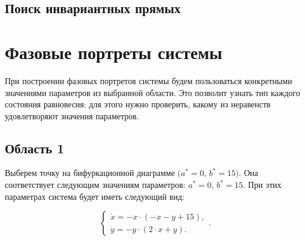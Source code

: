 \subsection{Поиск инвариантных прямых}
\newpage

\section{Фазовые портреты системы}
При построении фазовых портретов системы будем пользоваться конкретными значениями параметров из выбранной области. Это позволит узнать тип каждого состояния равновесия: для этого нужно проверить, какому из неравенств удовлетворяют значения параметров.

\subsection{Область 1}
Выберем точку на бифуркационной диаграмме $(a^\ast = 0$, $b^\ast = 15)$. Она соответствует следующим значениям параметров:  $a^\ast = 0$, $b^\ast = 15$. При этих параметрах система будет иметь следующий вид: 

$$
\left \lbrace 
\begin{matrix} 
	\dot{x} = -x \cdot (-x - y + 15), \\
	\dot{y} = -y \cdot (2 \cdot x + y). \
\end{matrix} 
\right . .$$

